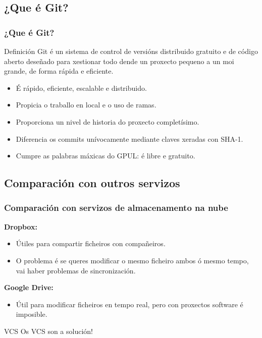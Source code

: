 \subsection{¿Que é Git?}
\begin{frame}
  \frametitle{¿Que é Git?}
  \begin{block}{Definición}
    Git é un sistema de control de versións distribuido gratuito e de código aberto deseñado para xestionar todo dende un proxecto pequeno a un moi grande, de forma rápida e eficiente.
  \end{block}
  \begin{itemize}
  \item É rápido, eficiente, escalable e distribuido.
  \item Propicia o traballo en local e o uso de ramas.
  \item Proporciona un nivel de historia do proxecto completísimo.
  \item Diferencia os commits unívocamente mediante claves xeradas con SHA-1.
  \item Cumpre as palabras máxicas do GPUL: é libre e gratuito.
  \end{itemize}
\end{frame}

\subsection{Comparación con outros servizos}
\begin{frame}
  \scriptsize
  \frametitle{Comparación con servizos de almacenamento na nube}
  \begin{multicols}{2}
    \textbf{Dropbox:}
    \begin{itemize}
    \item Útiles para compartir ficheiros con compañeiros.
    \item O problema é se queres modificar o mesmo ficheiro ambos ó mesmo tempo, vai haber problemas de sincronización.
    \end{itemize}
    \columnbreak
    \textbf{Google Drive:}
    \begin{itemize}
    \item Útil para modificar ficheiros en tempo real, pero con proxectos software é imposible.
    \end{itemize}
  \end{multicols}
  \begin{alertblock}{VCS}
    Os VCS son a solución!
  \end{alertblock}
\end{frame}

